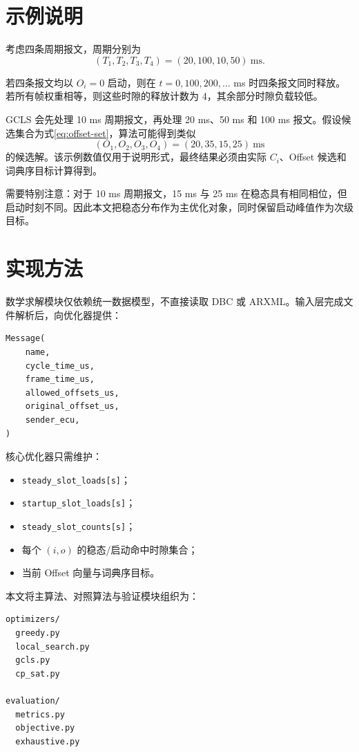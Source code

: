 \documentclass[UTF8,12pt,a4paper]{ctexart}
\begin{document}
\section{示例说明}

考虑四条周期报文，周期分别为
\begin{equation}
 (T_1,T_2,T_3,T_4)=(20,100,10,50)\ \mathrm{ms}.
\end{equation}

若四条报文均以 $O_i=0$ 启动，则在 $t=0,100,200,\ldots$ ms 时四条报文同时释放。若所有帧权重相等，则这些时隙的释放计数为 4，其余部分时隙负载较低。

GCLS 会先处理 10 ms 周期报文，再处理 20 ms、50 ms 和 100 ms 报文。假设候选集合为式\eqref{eq:offset-set}，算法可能得到类似
\begin{equation}
 (O_1,O_2,O_3,O_4)=(20,35,15,25)\ \mathrm{ms}
\end{equation}
的候选解。该示例数值仅用于说明形式，最终结果必须由实际 $C_i$、Offset 候选和词典序目标计算得到。

需要特别注意：对于 10 ms 周期报文，15 ms 与 25 ms 在稳态具有相同相位，但启动时刻不同。因此本文把稳态分布作为主优化对象，同时保留启动峰值作为次级目标。

\section{实现方法}

数学求解模块仅依赖统一数据模型，不直接读取 DBC 或 ARXML。输入层完成文件解析后，向优化器提供：

\begin{lstlisting}
Message(
    name,
    cycle_time_us,
    frame_time_us,
    allowed_offsets_us,
    original_offset_us,
    sender_ecu,
)
\end{lstlisting}

核心优化器只需维护：

\begin{itemize}
  \item \texttt{steady\_slot\_loads[s]}；
  \item \texttt{startup\_slot\_loads[s]}；
  \item \texttt{steady\_slot\_counts[s]}；
  \item 每个 $(i,o)$ 的稳态/启动命中时隙集合；
  \item 当前 Offset 向量与词典序目标。
\end{itemize}

本文将主算法、对照算法与验证模块组织为：

\begin{lstlisting}
optimizers/
  greedy.py
  local_search.py
  gcls.py
  cp_sat.py

evaluation/
  metrics.py
  objective.py
  exhaustive.py
\end{lstlisting}
\end{document}
